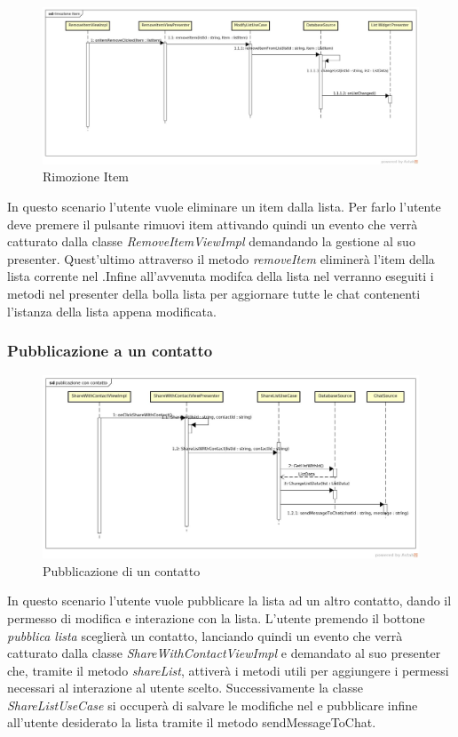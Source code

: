 \label{Rimozione Item }
\begin{figure}[H]
	\centering
	\includegraphics[width=\textwidth]{Sezioni/Diagrammi/img_app/rimozione_item.jpg}
	\caption{Rimozione Item}
	
\end{figure}
In questo scenario l'utente vuole eliminare un item dalla lista. Per farlo l'utente deve premere il pulsante rimuovi item attivando quindi un evento che verrà catturato dalla classe \textit{RemoveItemViewImpl} demandando la gestione al suo presenter. Quest'ultimo attraverso il metodo \textit{removeItem} eliminerà l'item della lista corrente nel .Infine all'avvenuta modifca della lista nel  verranno eseguiti i metodi nel presenter della bolla lista per aggiornare tutte le chat contenenti l'istanza della lista appena modificata.  
\newpage

\subsubsection{Pubblicazione a un contatto}

\label{Pubblicazione di un contatto}
\begin{figure}[H]
	\centering
	\includegraphics[width=\textwidth]{Sezioni/Diagrammi/img_app/publicazione_con_contatto.jpg}
	\caption{Pubblicazione di un contatto}
	
\end{figure}
In questo scenario l'utente vuole pubblicare la lista ad un altro contatto, dando il permesso di modifica e interazione con la lista. L'utente premendo il bottone \textit{pubblica lista} sceglierà un contatto, lanciando quindi un evento che verrà catturato dalla classe \textit{ShareWithContactViewImpl} e demandato al suo presenter che, tramite il metodo \textit{shareList}, attiverà i metodi utili per aggiungere i permessi necessari al interazione al utente scelto. Successivamente la classe \textit{ShareListUseCase} si occuperà di salvare le modifiche nel  e pubblicare infine all'utente desiderato la lista tramite il metodo {sendMessageToChat}.


